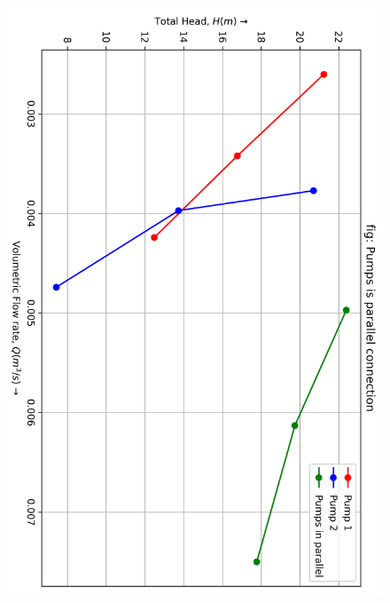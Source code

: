 \documentclass[12pt]{article}
\begin{document}
\begin{figure}[h]
  \begin{center}
    
    \includegraphics[width=0.85\linewidth]{img/parallel_graph.png}
  \end{center}
  \end{figure}
\end{document}
